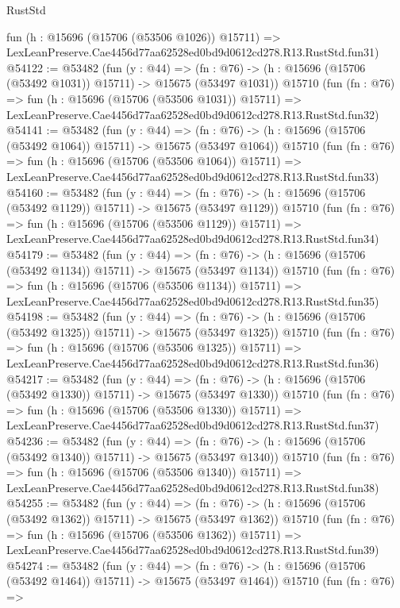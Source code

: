 \begin{lexlean}{RustStd}
\begin{coremodule}
    fun (h : @15696 (@15706 (@53506 @1026)) @15711) =>
    LexLeanPreserve.Cae4456d77aa62528ed0bd9d0612cd278.R13.RustStd.fun31)
@54122 := @53482
    (fun (y : @44) =>
    (fn : @76) -> (h : @15696 (@15706 (@53492 @1031)) @15711) -> @15675 (@53497 @1031))
    @15710
    (fun (fn : @76) =>
    fun (h : @15696 (@15706 (@53506 @1031)) @15711) =>
    LexLeanPreserve.Cae4456d77aa62528ed0bd9d0612cd278.R13.RustStd.fun32)
@54141 := @53482
    (fun (y : @44) =>
    (fn : @76) -> (h : @15696 (@15706 (@53492 @1064)) @15711) -> @15675 (@53497 @1064))
    @15710
    (fun (fn : @76) =>
    fun (h : @15696 (@15706 (@53506 @1064)) @15711) =>
    LexLeanPreserve.Cae4456d77aa62528ed0bd9d0612cd278.R13.RustStd.fun33)
@54160 := @53482
    (fun (y : @44) =>
    (fn : @76) -> (h : @15696 (@15706 (@53492 @1129)) @15711) -> @15675 (@53497 @1129))
    @15710
    (fun (fn : @76) =>
    fun (h : @15696 (@15706 (@53506 @1129)) @15711) =>
    LexLeanPreserve.Cae4456d77aa62528ed0bd9d0612cd278.R13.RustStd.fun34)
@54179 := @53482
    (fun (y : @44) =>
    (fn : @76) -> (h : @15696 (@15706 (@53492 @1134)) @15711) -> @15675 (@53497 @1134))
    @15710
    (fun (fn : @76) =>
    fun (h : @15696 (@15706 (@53506 @1134)) @15711) =>
    LexLeanPreserve.Cae4456d77aa62528ed0bd9d0612cd278.R13.RustStd.fun35)
@54198 := @53482
    (fun (y : @44) =>
    (fn : @76) -> (h : @15696 (@15706 (@53492 @1325)) @15711) -> @15675 (@53497 @1325))
    @15710
    (fun (fn : @76) =>
    fun (h : @15696 (@15706 (@53506 @1325)) @15711) =>
    LexLeanPreserve.Cae4456d77aa62528ed0bd9d0612cd278.R13.RustStd.fun36)
@54217 := @53482
    (fun (y : @44) =>
    (fn : @76) -> (h : @15696 (@15706 (@53492 @1330)) @15711) -> @15675 (@53497 @1330))
    @15710
    (fun (fn : @76) =>
    fun (h : @15696 (@15706 (@53506 @1330)) @15711) =>
    LexLeanPreserve.Cae4456d77aa62528ed0bd9d0612cd278.R13.RustStd.fun37)
@54236 := @53482
    (fun (y : @44) =>
    (fn : @76) -> (h : @15696 (@15706 (@53492 @1340)) @15711) -> @15675 (@53497 @1340))
    @15710
    (fun (fn : @76) =>
    fun (h : @15696 (@15706 (@53506 @1340)) @15711) =>
    LexLeanPreserve.Cae4456d77aa62528ed0bd9d0612cd278.R13.RustStd.fun38)
@54255 := @53482
    (fun (y : @44) =>
    (fn : @76) -> (h : @15696 (@15706 (@53492 @1362)) @15711) -> @15675 (@53497 @1362))
    @15710
    (fun (fn : @76) =>
    fun (h : @15696 (@15706 (@53506 @1362)) @15711) =>
    LexLeanPreserve.Cae4456d77aa62528ed0bd9d0612cd278.R13.RustStd.fun39)
@54274 := @53482
    (fun (y : @44) =>
    (fn : @76) -> (h : @15696 (@15706 (@53492 @1464)) @15711) -> @15675 (@53497 @1464))
    @15710
    (fun (fn : @76) =>

\end{coremodule}
\end{lexlean}
